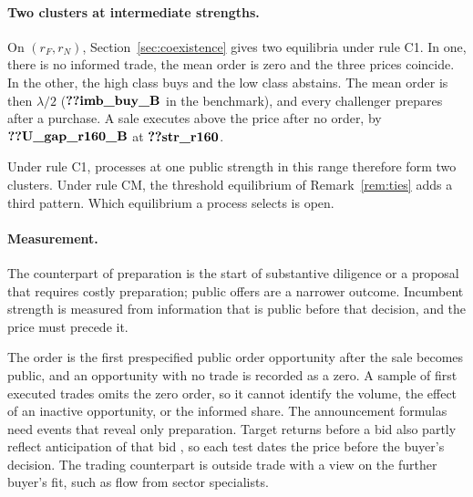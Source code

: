 \paragraph{Two clusters at intermediate strengths.} On \((r_F,r_N)\), Section~\ref{sec:coexistence} gives two
equilibria under rule C1. In one, there is no informed trade, the mean order is zero and the three prices coincide. In
the other, the high class buys and the low class abstains. The mean order is then \(\lambda/2\)
(\(\reg{imb_buy_B}\) in the benchmark), and every challenger prepares after a purchase. A sale executes above the price
after no order, by \(\reg{U_gap_r160_B}\) at \(\reg{str_r160}\).

Under rule C1, processes at one public strength in this
range therefore form two clusters. Under rule CM, the threshold equilibrium of Remark~\ref{rem:ties} adds a third
pattern. Which equilibrium a process selects is open.

\paragraph{Measurement.} The counterpart of preparation is the start of substantive diligence or a proposal that
requires costly preparation; public offers are a narrower outcome. Incumbent strength is measured from information
that is public before that decision, and the price must precede it.

The order is the first prespecified public order opportunity after the sale becomes public, and an opportunity with
no trade is recorded as a zero. A sample of first
executed trades omits the zero order, so it cannot identify the volume, the effect of an inactive opportunity, or the
informed share. The announcement formulas need events that reveal only preparation. Target returns before a bid also
partly reflect anticipation of that bid \citep{Schwert1996}, so each test dates the price before the buyer's decision. The trading counterpart is outside trade with a view
on the further buyer's fit, such as flow from sector specialists.
